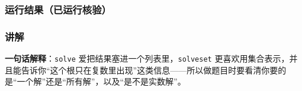 \begin{Shaded}
\begin{Highlighting}[]
\OperatorTok{=}\NormalTok{, }\NormalTok{)}
\OperatorTok{=}\NormalTok{)}
\NormalTok{(}
\NormalTok{(}
\end{Highlighting}
\end{Shaded}

\subsubsection{运行结果（已运行核验）}\label{ux8fd0ux884cux7ed3ux679cux5df2ux8fd0ux884cux6838ux9a8c-12}

\begin{Shaded}
\begin{Highlighting}[]
\end{Highlighting}
\end{Shaded}

\subsubsection{讲解}\label{ux8bb2ux89e3-12}

\textbf{一句话解释}：\texttt{solve}
爱把结果塞进一个列表里，\texttt{solveset}
更喜欢用集合表示，并且能告诉你``这个根只在复数里出现''这类信息------所以做题目时要看清你要的是``一个解''还是``所有解''，以及``是不是实数解''。

